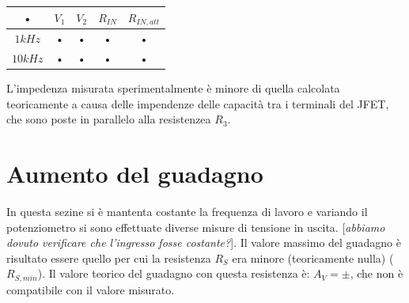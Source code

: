 \documentclass[10pt,a4paper]{article}
\newcommand{\rem}[1]{[\emph{#1}]}
\begin{document}
\begin{tabular}{|c|c|c|c|c|}
\hline 
• & $V_1$ & $V_2$ & $R_{IN}$ & $R_{IN, att}$ \\ 
\hline
$1 kHz$ & • & • & • & • \\ 
\hline 
$10 kHz$ & • & • & • & • \\ 
\hline 
\end{tabular} 
L'impedenza misurata sperimentalmente è minore di quella calcolata teoricamente a causa delle impendenze delle capacità tra i terminali del JFET, che sono poste in parallelo alla resistenzea $R_3$.

\section{Aumento del guadagno}
In questa sezine si è mantenta costante la frequenza di lavoro e variando il potenziometro si sono effettuate diverse misure di tensione in uscita. \rem{abbiamo dovuto verificare che l'ingresso fosse costante?}. Il valore massimo del guadagno è risultato essere quello per cui la resistenza $R_S$ era minore (teoricamente nulla) ($R_{S, min}$). Il valore teorico del guadagno con questa resistenza è: $A_V = \pm $, che non è compatibile con il valore misurato.
\end{document}
